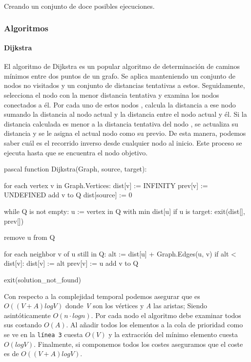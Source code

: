 Creando un conjunto de doce posibles ejecuciones.

\subsubsection{Algoritmos}

\paragraph{Dijkstra}
El algoritmo de Dijkstra es un popular algoritmo de determinación de caminos mínimos entre dos puntos de un grafo. Se aplica manteniendo un conjunto de nodos no visitados y un conjunto de distancias tentativas a estos. Seguidamente, selecciona el nodo con la menor distancia tentativa y examina los nodos conectados a él. Por cada uno de estos nodos , calcula la distancia a ese nodo sumando la distancia al nodo actual y la distancia entre el nodo actual y él. Si la distancia calculada es menor a la distancia tentativa del nodo , se actualiza su distancia y se le asigna el actual nodo como su previo. De esta manera, podemos saber cuál es el recorrido inverso desde cualquier nodo al inicio. Este proceso se ejecuta hasta que se encuentra el nodo objetivo.

\begin{code}{\scriptsize}{pascal}
function Dijkstra(Graph, source, target):
    
    for each vertex v in Graph.Vertices:
        dist[v] := INFINITY
        prev[v] := UNDEFINED
        add v to Q
    dist[source] := 0
    
    while Q is not empty:
        u := vertex in Q with min dist[u]
        if u is target:
            exit(dist[], prev[])
            
        remove u from Q
        
        for each neighbor v of u still in Q:
            alt := dist[u] + Graph.Edges(u, v)
            if alt < dist[v]:
                dist[v] := alt
                prev[v] := u
                add v to Q

    exit(solution_not_found)
\end{code}

Con respecto a la complejidad temporal podemos asegurar que es $O((V + A) logV)$ donde \textit{V} son los vértices y \textit{A} las aristas; Siendo asintóticamente $O(n · logn)$. Por cada nodo el algoritmo debe examinar todos sus  costando $O(A)$. Al añadir todos los elementos a la cola de prioridad como se ve en la \texttt{línea 3} cuesta $O(V)$ y la extracción del mínimo elemento cuesta $O(logV)$. Finalmente, si componemos todos los costes aseguramos que el coste es de $O((V + A) log V)$. \\

